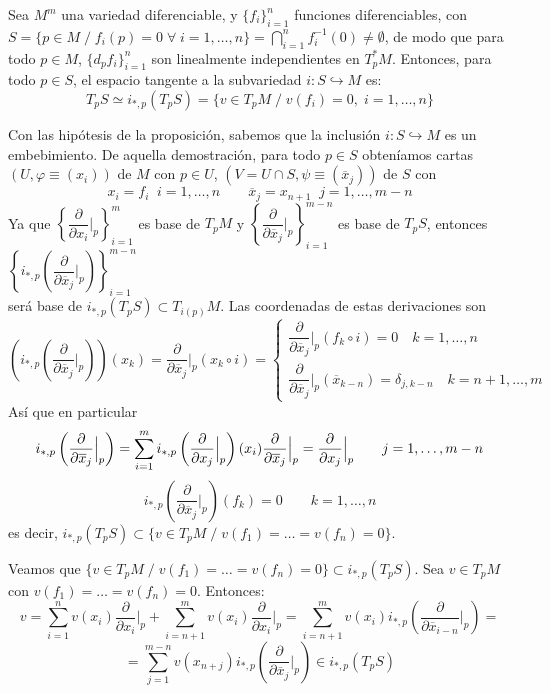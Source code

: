 \begin{prop}
Sea $M^m$ una variedad diferenciable, y $\{f_i\}_{i=1}^n$ funciones diferenciables, con $\displaystyle S = \{p\in M\; / \; f_i(p) = 0 \;\forall\; i=1,\dots,n\}= \bigcap_{i=1}^n f_i^{-1}(0) \neq \emptyset$, de modo que para todo $p\in M$, $\{d_pf_i\}_{i=1}^n$ son linealmente independientes en $T_p^*M$. Entonces, para todo $p\in S$, el espacio tangente a la subvariedad $i: S \hookrightarrow M$ es:
$$T_pS \simeq i_{*,p}(T_pS) = \{v \in T_pM \;/\; v(f_i) = 0,\; i=1,\dots,n\}$$
\end{prop}
\begin{dem}
Con las hipótesis de la proposición, sabemos que la inclusión $i:S \hookrightarrow M$ es un embebimiento. De aquella demostración, para todo $p \in S$ obteníamos cartas $(U,\varphi\equiv(x_i))$ de $M$ con $p\in U$, $(V=U\cap S,\psi\equiv (\overline{x}_j))$ de $S$ con $$x_i = f_i \;\; i=1,\dots,n \qquad \overline{x}_j = x_{n+1} \;\; j=1,\dots,m-n$$
Ya que $\left\{\dfrac{\partial}{\partial x_i}\Big|_p\right\}_{i=1}^m$ es base de $T_pM$ y $\left\{\dfrac{\partial}{\partial \overline{x}_j}\Big|_p\right\}_{i=1}^{m-n}$ es base de $T_pS$, entonces $\left\{i_{*,p}\left(\dfrac{\partial}{\partial \overline{x}_j}\Big|_p\right)\right\}_{i=1}^{m-n}$\\[3mm] será base de $i_{*,p}(T_pS)  \subset T_{i(p)}M$. Las coordenadas de estas derivaciones son $$\left(i_{*,p}\left(\dfrac{\partial}{\partial \overline{x}_j}\Big|_p\right) \right)(x_k) = \dfrac{\partial}{\partial \overline{x}_j}\Big|_p (x_k\circ i) = \begin{cases}
\dfrac{\partial}{\partial \overline{x}_j}\Big|_p(f_k \circ i) = 0 \quad k=1,\dots,n\\[3mm]
\dfrac{\partial}{\partial \overline{x}_j}\Big|_p(\overline{x}_{k-n}) = \delta_{j,k-n} \quad k=n+1,\dots,m 
\end{cases}$$
Así que en particular $$i_{*,p}\left(\dfrac{\partial}{\partial \overline{x}_j}\Big|_p\right) =\sum_{i=1}^m  i_{*,p}\left(\dfrac{\partial}{\partial x_j}\Big|_p\right)(x_i) \dfrac{\partial}{\partial \overline{x}_j}\Big|_p= \dfrac{\partial^{} }{\partial x_j}\Big|_p \qquad j=1,\dots,m-n $$ $$i_{*,p}\left(\dfrac{\partial}{\partial \overline{x}_j}\Big|_p\right) (f_k) = 0\qquad k=1,\dots,n$$
es decir, $i_{*,p}(T_pS) \subset \{v \in T_pM \;/\;v(f_1) = \dots = v(f_n) = 0\}$. 

Veamos que $\{v \in T_pM \;/\;v(f_1) = \dots = v(f_n) = 0\} \subset i_{*,p}(T_pS)$. Sea $v \in T_pM$ con $v(f_1) = \dots = v(f_n) = 0$. Entonces:
$$v= \sum_{i=1}^n v(x_i) \dfrac{\partial}{\partial x_i}\Big|_p + \sum_{i=n+1}^m v(x_i)  \dfrac{\partial}{\partial x_i}\Big|_p = \sum_{i=n+1}^m v(x_i)i_{*,p}\left(\dfrac{\partial}{\partial \overline{x}_{i-n}}\Big|_p\right) = $$ $$=\sum_{j=1}^{m-n} v(x_{n+j}) i_{*,p}\left(\dfrac{\partial}{\partial \overline{x}_{j}}\Big|_p\right) \in i_{*,p}(T_pS)$$
\end{dem}
